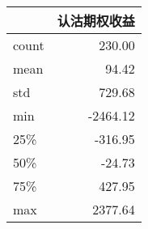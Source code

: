 \begin{tabular}{lr}
\toprule
{} &   认沽期权收益 \\
\midrule
count &   230.00 \\
mean  &    94.42 \\
std   &   729.68 \\
min   & -2464.12 \\
25\%   &  -316.95 \\
50\%   &   -24.73 \\
75\%   &   427.95 \\
max   &  2377.64 \\
\bottomrule
\end{tabular}
